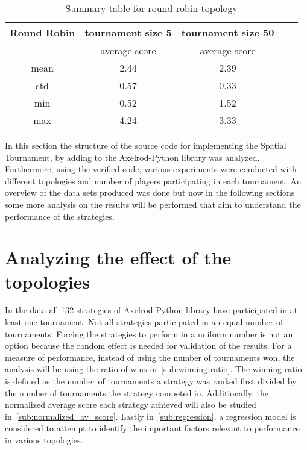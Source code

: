 \begin{table}[H]
	\centering
	\begin{adjustbox}{width=0.5\textwidth}
		\small
		\begin{tabular}{ccccc}
				\toprule
		Round Robin & \multicolumn{1}{|c|}{tournament size 5} & \multicolumn{1}{c}{tournament size 50} \\ \hline

		            & average score                          & average score                           \\ \hline
		mean        & 2.44                                   & 2.39                                    \\ \hline
		std         & 0.57                                   & 0.33                                    \\ \hline
		min         & 0.52                                   & 1.52                                    \\ \hline
		max         & 4.24                                   & 3.33                                    \\ \bottomrule
	\end{tabular}
\end{adjustbox}
	\caption{Summary table for round robin topology}
	\label{sum-rr}
\end{table}

In this section the structure of the source code for implementing the Spatial
Tournament, by adding to the Axelrod-Python library was analyzed. Furthermore,
using the verified code, various experiments were conducted with different
topologies
and number of players participating in each tournament. An overview of the
data sets produced was done but now in the following sections
some more analysis on the results will be performed that aim to understand
the performance of the strategies.

\section{Analyzing the effect of the topologies}
\label{sub:analyzing_the_effect_of_the_topologies}
In the data all 132 strategies of Axelrod-Python library have participated in at
least one tournament. Not all strategies participated in an equal number of tournaments.
Forcing the strategies to perform in a uniform number is
not an option because the random effect is needed for validation of the
results. For a measure of
performance, instead of using the number of tournaments won, the analysis will
be using the ratio of wins in~\autoref{sub:winning-ratio}.
The winning ratio is defined as the number of tournaments a strategy was ranked
first divided by the number of tournaments the strategy competed in.
Additionally, the normalized average score each strategy
achieved will also be studied in~\autoref{sub:normalized_av_score}.
Lastly in~\autoref{sub:regression}, a regression model is considered to
attempt to identify the important factors relevant to performance in various
topologies.

